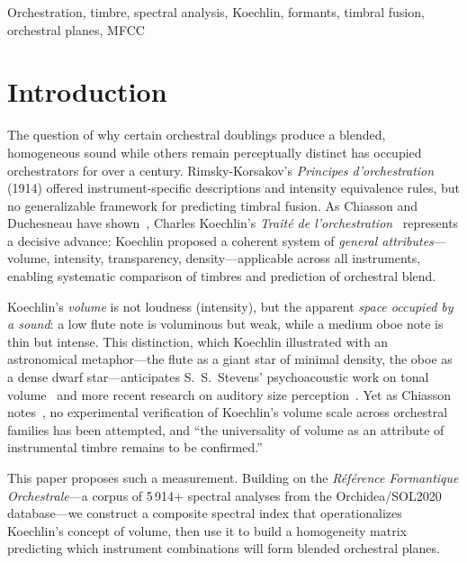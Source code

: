 \documentclass[journal]{IEEEtran}
\begin{document}
\begin{IEEEkeywords}
Orchestration, timbre, spectral analysis, Koechlin, formants, timbral fusion, orchestral planes, MFCC
\end{IEEEkeywords}

\section{Introduction}
\label{sec:intro}

The question of why certain orchestral doublings produce a blended, homogeneous sound while others remain perceptually distinct has occupied orchestrators for over a century. Rimsky-Korsakov's \textit{Principes d'orchestration} (1914) offered instrument-specific descriptions and intensity equivalence rules, but no generalizable framework for predicting timbral fusion. As Chiasson and Duchesneau have shown~\cite{Chiasson2008, DuchesneauChiasson}, Charles Koechlin's \textit{Traité de l'orchestration}~\cite{Koechlin1954} represents a decisive advance: Koechlin proposed a coherent system of \emph{general attributes}---volume, intensity, transparency, density---applicable across all instruments, enabling systematic comparison of timbres and prediction of orchestral blend.

Koechlin's \textit{volume} is not loudness (intensity), but the apparent \emph{space occupied by a sound}: a low flute note is voluminous but weak, while a medium oboe note is thin but intense. This distinction, which Koechlin illustrated with an astronomical metaphor---the flute as a giant star of minimal density, the oboe as a dense dwarf star---anticipates S.~S.~Stevens' psychoacoustic work on tonal volume~\cite{Stevens1965} and more recent research on auditory size perception~\cite{VanDinther2006}. Yet as Chiasson notes~\cite{ChiassonHumaniste}, no experimental verification of Koechlin's volume scale across orchestral families has been attempted, and ``the universality of volume as an attribute of instrumental timbre remains to be confirmed.''

This paper proposes such a measurement. Building on the \textit{Référence Formantique Orchestrale}---a corpus of 5\,914+ spectral analyses from the Orchidea/SOL2020 database---we construct a composite spectral index that operationalizes Koechlin's concept of volume, then use it to build a homogeneity matrix predicting which instrument combinations will form blended orchestral planes.
\end{document}
